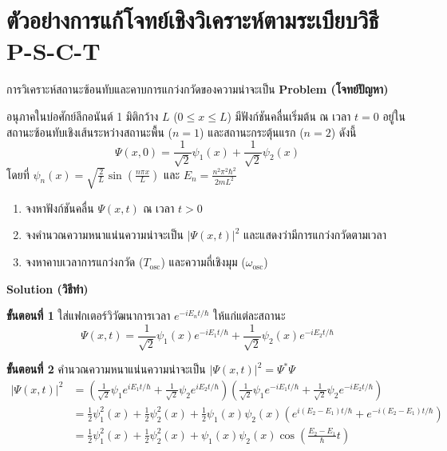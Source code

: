 \section{ตัวอย่างการแก้โจทย์เชิงวิเคราะห์ตามระเบียบวิธี P-S-C-T}

\begin{psctbox}{การวิเคราะห์สถานะซ้อนทับและคาบการแกว่งกวัดของความน่าจะเป็น}
\textbf{Problem (โจทย์ปัญหา)}

อนุภาคในบ่อศักย์ลึกอนันต์ 1 มิติกว้าง $L$ ($0 \le x \le L$) มีฟังก์ชันคลื่นเริ่มต้น ณ เวลา $t = 0$ อยู่ในสถานะซ้อนทับเชิงเส้นระหว่างสถานะพื้น ($n = 1$) และสถานะกระตุ้นแรก ($n = 2$) ดังนี้
\begin{equation*}
\Psi(x, 0) = \frac{1}{\sqrt{2}}\psi_1(x) + \frac{1}{\sqrt{2}}\psi_2(x)
\end{equation*}
โดยที่ $\psi_n(x) = \sqrt{\frac{2}{L}}\sin\left( \frac{n\pi x}{L} \right)$ และ $E_n = \frac{n^2 \pi^2 \hbar^2}{2mL^2}$
\begin{enumerate}
    \item จงหาฟังก์ชันคลื่น $\Psi(x, t)$ ณ เวลา $t > 0$
    \item จงคำนวณความหนาแน่นความน่าจะเป็น $|\Psi(x, t)|^2$ และแสดงว่ามีการแกว่งกวัดตามเวลา
    \item จงหาคาบเวลาการแกว่งกวัด ($T_{\text{osc}}$) และความถี่เชิงมุม ($\omega_{\text{osc}}$)
\end{enumerate}

\textbf{Solution (วิธีทำ)}

\textbf{ขั้นตอนที่ 1} ใส่แฟกเตอร์วิวัฒนาการเวลา $e^{-iE_n t/\hbar}$ ให้แก่แต่ละสถานะ
\begin{equation*}
\Psi(x, t) = \frac{1}{\sqrt{2}}\psi_1(x) e^{-iE_1 t/\hbar} + \frac{1}{\sqrt{2}}\psi_2(x) e^{-iE_2 t/\hbar}
\end{equation*}

\textbf{ขั้นตอนที่ 2} คำนวณความหนาแน่นความน่าจะเป็น $|\Psi(x, t)|^2 = \Psi^* \Psi$
\begin{align*}
|\Psi(x, t)|^2 &= \left( \frac{1}{\sqrt{2}}\psi_1 e^{iE_1 t/\hbar} + \frac{1}{\sqrt{2}}\psi_2 e^{iE_2 t/\hbar} \right) \left( \frac{1}{\sqrt{2}}\psi_1 e^{-iE_1 t/\hbar} + \frac{1}{\sqrt{2}}\psi_2 e^{-iE_2 t/\hbar} \right) \\
&= \frac{1}{2}\psi_1^2(x) + \frac{1}{2}\psi_2^2(x) + \frac{1}{2}\psi_1(x)\psi_2(x)\left( e^{i(E_2 - E_1)t/\hbar} + e^{-i(E_2 - E_1)t/\hbar} \right) \\
&= \frac{1}{2}\psi_1^2(x) + \frac{1}{2}\psi_2^2(x) + \psi_1(x)\psi_2(x)\cos\left( \frac{E_2 - E_1}{\hbar} t \right)
\end{align*}


\end{psctbox}
